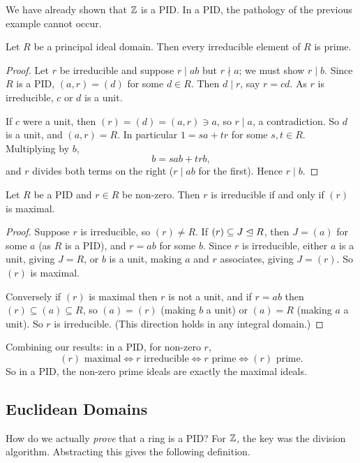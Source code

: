 \documentclass[a4paper]{scrartcl}
\begin{document}
We have already shown that $\mathbb{Z}$ is a PID. In a PID, the pathology of the previous example cannot occur.

\begin{proposition}
	Let $R$ be a principal ideal domain. Then every irreducible element of $R$ is prime.
\end{proposition}
\begin{proof}
	Let $r$ be irreducible and suppose $r \mid ab$ but $r \nmid a$; we must show $r \mid b$. Since $R$ is a PID, $(a, r) = (d)$ for some $d \in R$. Then $d \mid r$, say $r = cd$. As $r$ is irreducible, $c$ or $d$ is a unit.

	If $c$ were a unit, then $(r) = (d) = (a, r) \ni a$, so $r \mid a$, a contradiction. So $d$ is a unit, and $(a, r) = R$. In particular $1 = sa + tr$ for some $s, t \in R$. Multiplying by $b$,
	$$
	b = sab + trb,
	$$
	and $r$ divides both terms on the right ($r \mid ab$ for the first). Hence $r \mid b$.
\end{proof}

\begin{lemma}
	Let $R$ be a PID and $r \in R$ be non-zero. Then $r$ is irreducible if and only if $(r)$ is maximal.
\end{lemma}
\begin{proof}
	Suppose $r$ is irreducible, so $(r) \neq R$. If $(r) \subseteq J \trianglelefteq R$, then $J = (a)$ for some $a$ (as $R$ is a PID), and $r = ab$ for some $b$. Since $r$ is irreducible, either $a$ is a unit, giving $J = R$, or $b$ is a unit, making $a$ and $r$ associates, giving $J = (r)$. So $(r)$ is maximal.

	Conversely if $(r)$ is maximal then $r$ is not a unit, and if $r = ab$ then $(r) \subseteq (a) \subseteq R$, so $(a) = (r)$ (making $b$ a unit) or $(a) = R$ (making $a$ a unit). So $r$ is irreducible. (This direction holds in any integral domain.)
\end{proof}

Combining our results: in a PID, for non-zero $r$,
$$
(r) \text{ maximal} \iff r \text{ irreducible} \iff r \text{ prime} \iff (r) \text{ prime}.
$$
So in a PID, the non-zero prime ideals are exactly the maximal ideals.

\subsection{Euclidean Domains}

How do we actually \emph{prove} that a ring is a PID? For $\mathbb{Z}$, the key was the division algorithm. Abstracting this gives the following definition.
\end{document}
